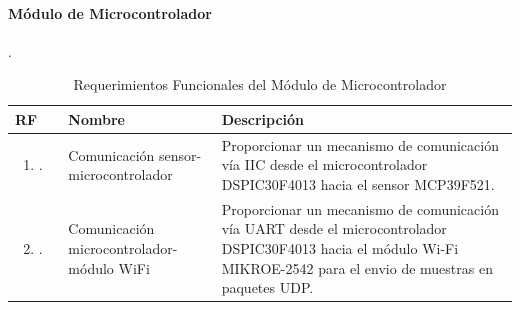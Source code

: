 \paragraph{Módulo de Microcontrolador}.
\begin{longtable}{|M{1.6cm}|M{4.0cm}|M{6.0cm}|}
    \caption{Requerimientos Funcionales del Módulo de Microcontrolador}
	\hline
	\textbf{RF} & \textbf{Nombre} & \textbf{Descripción} \\ 
	\hline
 	\begin{enumerate}[label=RF\arabic*]
 	    \item.
 	\end{enumerate}
 	& Comunicación sensor-microcontrolador
 	& Proporcionar un mecanismo de comunicación vía IIC desde el microcontrolador DSPIC30F4013 hacia el sensor MCP39F521. \\
    \hline
    \begin{enumerate}[label=RF\arabic*]
        \setcounter{enumi}{1}
 	    \item.
 	\end{enumerate}
 	& Comunicación microcontrolador-módulo WiFi
 	& Proporcionar un mecanismo de comunicación vía UART desde el microcontrolador DSPIC30F4013 hacia el módulo Wi-Fi MIKROE-2542 para el envio de muestras en paquetes UDP. \\
    \hline
\end{longtable}



